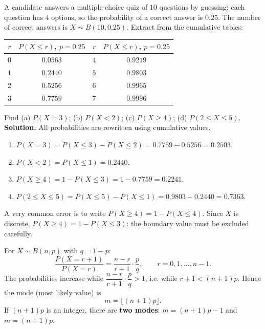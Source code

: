 \documentclass[11pt]{article}
\newcommand{\cle}[1]{{\popxbold\color{popdark}#1}}
\begin{document}
\begin{exoresolu}
A candidate answers a multiple-choice quiz of $10$ questions by guessing; each question has $4$ options, so the probability of a correct answer is $0.25$. The number of correct answers is $X \sim B(10, 0.25)$. Extract from the cumulative tables:
\begin{center}
\begin{tabular}{|c|c|c|c|}
\hline
\rowcolor{popblueL} $r$ & $P(X \leq r)$, $p=0.25$ & $r$ & $P(X \leq r)$, $p=0.25$ \\
\hline
$0$ & $0.0563$ & $4$ & $0.9219$ \\
\hline
$1$ & $0.2440$ & $5$ & $0.9803$ \\
\hline
$2$ & $0.5256$ & $6$ & $0.9965$ \\
\hline
$3$ & $0.7759$ & $7$ & $0.9996$ \\
\hline
\end{tabular}
\end{center}
Find (a) $P(X = 3)$; (b) $P(X < 2)$; (c) $P(X \geq 4)$; (d) $P(2 \leq X \leq 5)$.
\tcblower
\textbf{Solution.} All probabilities are rewritten using cumulative values.
\begin{enumerate}
\item[(a)] $P(X = 3) = P(X \leq 3) - P(X \leq 2) = 0.7759 - 0.5256 = 0.2503$.
\item[(b)] $P(X < 2) = P(X \leq 1) = 0.2440$.
\item[(c)] $P(X \geq 4) = 1 - P(X \leq 3) = 1 - 0.7759 = 0.2241$.
\item[(d)] $P(2 \leq X \leq 5) = P(X \leq 5) - P(X \leq 1) = 0.9803 - 0.2440 = 0.7363$.
\end{enumerate}
\begin{attention}
A very common error is to write $P(X \geq 4) = 1 - P(X \leq 4)$. Since $X$ is discrete, $P(X \geq 4) = 1 - P(X \leq 3)$: the boundary value must be excluded carefully.
\end{attention}
\end{exoresolu}

\begin{propriete}
For $X \sim B(n,p)$ with $q=1-p$:
\[ \frac{P(X = r+1)}{P(X = r)} = \frac{n - r}{r + 1}\cdot\frac{p}{q}, \qquad r = 0, 1, \ldots, n-1. \]
The probabilities increase while $\dfrac{n-r}{r+1}\cdot\dfrac{p}{q} > 1$, i.e. while $r + 1 < (n+1)p$.
Hence the \cle{mode} (most likely value) is
\[ m = \lfloor (n+1)p \rfloor. \]
If $(n+1)p$ is an integer, there are \textbf{two modes}: $m = (n+1)p - 1$ and $m = (n+1)p$.
\end{propriete}
\end{document}
